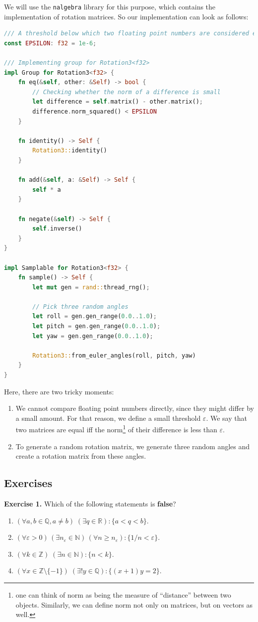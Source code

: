 \documentclass[../lecture-notes.tex]{subfiles}
\begin{document}
We will use the \texttt{nalgebra} library for this purpose, which contains the implementation of rotation matrices. So our implementation can look as follows:
\begin{lstlisting}[language=Rust]
/// A threshold below which two floating point numbers are considered equal.
const EPSILON: f32 = 1e-6;

/// Implementing group for Rotation3<f32>
impl Group for Rotation3<f32> {
    fn eq(&self, other: &Self) -> bool {
        // Checking whether the norm of a difference is small
        let difference = self.matrix() - other.matrix();
        difference.norm_squared() < EPSILON
    }

    fn identity() -> Self {
        Rotation3::identity()
    }

    fn add(&self, a: &Self) -> Self {
        self * a
    }

    fn negate(&self) -> Self {
        self.inverse()
    }
}

impl Samplable for Rotation3<f32> {
    fn sample() -> Self {
        let mut gen = rand::thread_rng();

        // Pick three random angles
        let roll = gen.gen_range(0.0..1.0);
        let pitch = gen.gen_range(0.0..1.0);
        let yaw = gen.gen_range(0.0..1.0);

        Rotation3::from_euler_angles(roll, pitch, yaw)
    }
}
\end{lstlisting}

Here, there are two tricky moments:
\begin{enumerate}
    \item We cannot compare floating point numbers directly, since they might differ by a small amount. For that reason, we define a small threshold $\varepsilon$. We say that two matrices are equal iff the norm\footnote{one can think of norm as being the measure of ``distance'' between two objects. Similarly, we can define norm not only on matrices, but on vectors as well.} of their difference is less than $\varepsilon$.
    \item To generate a random rotation matrix, we generate three random angles and create a rotation matrix from these angles.
\end{enumerate}

\subsection{Exercises}

\textbf{Exercise 1.} Which of the following statements is \textbf{false}?
\begin{enumerate}
    \item $(\forall a, b \in \mathbb{Q}, a \neq b) \; (\exists q \in \mathbb{R}): \{a < q < b\}$.
    \item $(\forall \varepsilon > 0) \, (\exists n_{\varepsilon} \in \mathbb{N}) \, (\forall n \geq n_{\varepsilon}): \{1/n < \varepsilon\}$.
    \item $(\forall k \in \mathbb{Z}) \; (\exists n \in \mathbb{N}): \{n < k\}$.
    \item $(\forall x \in \mathbb{Z} \setminus \{-1\}) \; (\exists! y \in \mathbb{Q}): \{(x+1)y = 2\}$.
\end{enumerate}
\end{document}
